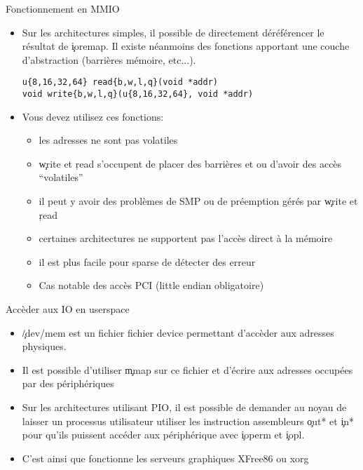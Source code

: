 \begin{frame}[fragile=singleslide]{Fonctionnement en MMIO}
  \begin{itemize}
  \item  Sur les  architectures  simples, il  possible de  directement
    déréférencer le résultat de  \c{ioremap}.  Il existe néanmoins des
    fonctions apportant  une couche d'abstraction  (barrières mémoire,
    etc...).
    \begin{lstlisting}
u{8,16,32,64} read{b,w,l,q}(void *addr)
void write{b,w,l,q}(u{8,16,32,64}, void *addr)
    \end{lstlisting}
  \item Vous  devez utilisez ces  fonctions:
    \begin{itemize}
    \item les adresses ne sont pas volatiles
    \item \c{write} et \c{read}  s'occupent de placer des barrières et
      ou d'avoir des accès ``volatiles''
    \item il peut y avoir des  problèmes de SMP ou de préemption gérés
      par \c{write} et \c{read}
    \item certaines  architectures ne supportent pas  l'accès direct à
      la mémoire
    \item il est plus facile pour sparse de détecter des erreur
    \item Cas notable des accès PCI (little endian obligatoire)
    \end{itemize}
  \end{itemize}
\end{frame}


\begin{frame}[fragile=singleslide]{Accèder aux IO en userspace}
  \begin{itemize}
  \item  \c{/dev/mem}   est  un  fichier   fichier  device  permettant
    d'accèder aux adresses physiques.
  \item Il est possible d'utiliser \c{mmap} sur ce fichier et d'écrire
    aux adresses occupées par des périphériques
  \item  Sur  les architectures  utilisant  PIO,  il  est possible  de
    demander au noyau de laisser un processus utilisateur utiliser les
    instruction assembleurs  \c{out*} et \c{in*}  pour qu'ils puissent
    accéder aux périphérique avec \c{ioperm} et \c{iopl}.
  \item C'est ainsi que  fonctionne les serveurs graphiques XFree86 ou
    xorg
  \end{itemize}
\end{frame}


